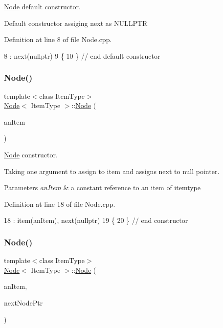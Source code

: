 \hyperlink{classNode}{Node} default constructor. 

Default constructor assiging next as N\+U\+L\+L\+P\+TR 

Definition at line 8 of file Node.\+cpp.


\begin{DoxyCode}
8                      : next(\textcolor{keyword}{nullptr})
9 \{
10 \} \textcolor{comment}{// end default constructor}
\end{DoxyCode}
\mbox{\label{classNode_a0288598fcb0244739ce95099c26250ae}} 
\subsubsection{\texorpdfstring{Node()}{Node()}\hspace{0.1cm}{\footnotesize\ttfamily [2/3]}}
{\footnotesize\ttfamily template$<$class Item\+Type$>$ \\
\hyperlink{classNode}{Node}$<$ Item\+Type $>$\+::\hyperlink{classNode}{Node} (\begin{DoxyParamCaption}\item[{const Item\+Type \&}]{an\+Item }\end{DoxyParamCaption})}



\hyperlink{classNode}{Node} constructor. 

Taking one argument to assign to item and assigns next to null pointer. 
\begin{DoxyParams}{Parameters}
{\em an\+Item} & a constant reference to an item of itemtype \\
\hline
\end{DoxyParams}


Definition at line 18 of file Node.\+cpp.


\begin{DoxyCode}
18                                            : item(anItem), next(\textcolor{keyword}{nullptr})
19 \{
20 \} \textcolor{comment}{// end constructor}
\end{DoxyCode}
\mbox{\label{classNode_adf98d3f9b7227622cb5a0fdd7e8f0b18}} 
\subsubsection{\texorpdfstring{Node()}{Node()}\hspace{0.1cm}{\footnotesize\ttfamily [3/3]}}
{\footnotesize\ttfamily template$<$class Item\+Type$>$ \\
\hyperlink{classNode}{Node}$<$ Item\+Type $>$\+::\hyperlink{classNode}{Node} (\begin{DoxyParamCaption}\item[{const Item\+Type \&}]{an\+Item,  }\item[{\hyperlink{classNode}{Node}$<$ Item\+Type $>$ $\ast$}]{next\+Node\+Ptr }\end{DoxyParamCaption})}



